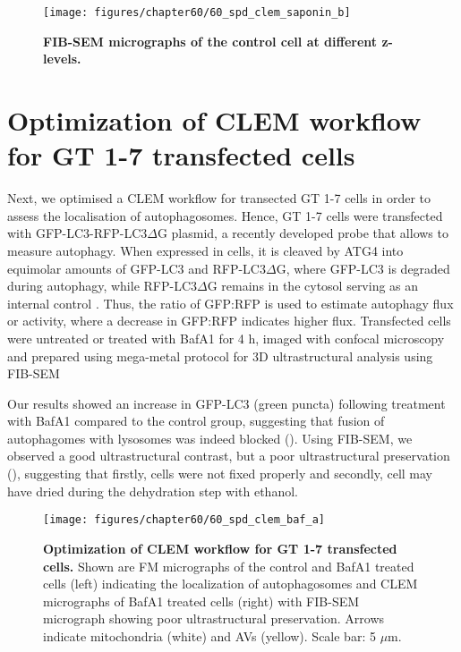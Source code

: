 \begin{landscape}
\begin{figure}[!htbp]
\center
  \texttt{[image: figures/chapter60/60\_spd\_clem\_saponin\_b]}
  \caption[FIB-SEM micrographs of the control cell at different z-levels]{\textbf{FIB-SEM micrographs of the control cell at different z-levels.}}
  \label{fig:60_spd_clem_saponin_b}
\end{figure} 
\end{landscape}

\section{Optimization of CLEM workflow for GT 1-7 transfected cells}
Next, we optimised a CLEM workflow for transected GT 1-7 cells in order to assess the localisation of autophagosomes. Hence, GT 1-7 cells were transfected with GFP-LC3-RFP-LC3$\Delta$G plasmid, a recently developed probe that allows to measure autophagy. When expressed in cells, it is cleaved by ATG4 into equimolar amounts of GFP-LC3 and RFP-LC3$\Delta$G, where GFP-LC3 is degraded during autophagy, while RFP-LC3$\Delta$G remains in the cytosol serving as an internal control \citep{Kaizuka2016}. Thus, the ratio of GFP:RFP is used to estimate autophagy flux or activity, where a decrease in GFP:RFP indicates higher flux. Transfected cells were untreated or treated with BafA1 for 4 h, imaged with confocal microscopy and prepared using mega-metal protocol for 3D ultrastructural analysis using FIB-SEM

Our results showed an increase in GFP-LC3 (green puncta) following treatment with BafA1 compared to the control group, suggesting that fusion of autophagomes with lysosomes was indeed blocked (). Using FIB-SEM, we observed a good ultrastructural contrast, but a poor ultrastructural preservation (), suggesting that firstly, cells were not fixed properly and secondly, cell may have dried during the dehydration step with ethanol. 

\begin{landscape}
\begin{figure}[!htbp]
\center
  \texttt{[image: figures/chapter60/60\_spd\_clem\_baf\_a]}
  \caption[Optimization of CLEM workflow for GT 1-7 transfected cells]{\textbf{Optimization of CLEM workflow for GT 1-7 transfected cells.} Shown are FM micrographs of the control and BafA1 treated cells (left) indicating the localization of autophagosomes and CLEM micrographs of BafA1 treated cells (right) with FIB-SEM micrograph showing poor ultrastructural preservation. Arrows indicate mitochondria (white) and AVs (yellow). Scale bar: 5 $\mu$m.}
  \label{fig:60_spd_clem_baf_a}
\end{figure} 
\end{landscape}

